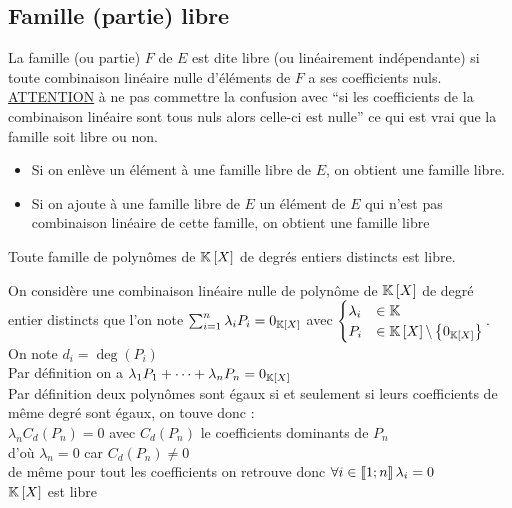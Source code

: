 \subsection{Famille (partie) libre}
\begin{defi}
    La famille (ou partie) \(F\) de \(E\) est dite libre (ou linéairement indépendante) si toute combinaison linéaire nulle d’éléments de \(F\) a ses coefficients nuls.\\
    \underline{ATTENTION} à ne pas commettre la confusion avec “si les coefficients de la combinaison linéaire sont tous nuls alors celle-ci est nulle” ce qui est vrai que la famille soit libre ou non.
\end{defi}
\begin{prop}
    \begin{itemize}
        \item Si on enlève un élément à une famille libre de \(E\), on obtient une famille libre.
        \item Si on ajoute à une famille libre de \(E\) un élément de \(E\) qui n’est pas combinaison linéaire de cette famille, on obtient une famille libre
    \end{itemize}
\end{prop}
\begin{defprop}
    Toute famille de polynômes de \(\mathbb{K} \left[X\right]\) de degrés entiers distincts est libre.
\end{defprop}
\begin{dem}
    On considère une combinaison linéaire nulle de polynôme de \(\mathbb{K} \left[ X\right]\) de degré entier distincts que l'on note \(\sum_{i = 1}^n \lambda_i P_i = 0 _{\mathbb{K} \left[X\right]}\) avec 
    \(\begin{cases}
        \lambda_i &\in \mathbb{K} \\
        P_i &\in \mathbb{K} \left[X\right] \backslash \left\lbrace0_{\mathbb{K} \left[X\right]}\right\rbrace
    \end{cases}\).\\
    On note \(d_i = \deg(P_i)\)\\
    Par définition on a \(\lambda_1 P_1 + \dots + \lambda_n P_n = 0_{\mathbb{K} \left[X\right]}\)\\
    Par définition deux polynômes sont égaux si et seulement si leurs coefficients de même degré sont égaux, on touve donc  : \\
    \(\lambda_n C_d(P_n) = 0\) avec \(C_d(P_n)\) le coefficients dominants de \(P_n\)\\
    d'où \(\lambda_n = 0\) car \(C_d(P_n)\neq 0\)\\ de même pour tout les coefficients on retrouve donc \(\forall i \in \left\llbracket1;n\right\rrbracket\lambda_i = 0\) \\
    \conclusion\(\mathbb{K}\left[X\right]\) est libre

\end{dem}
